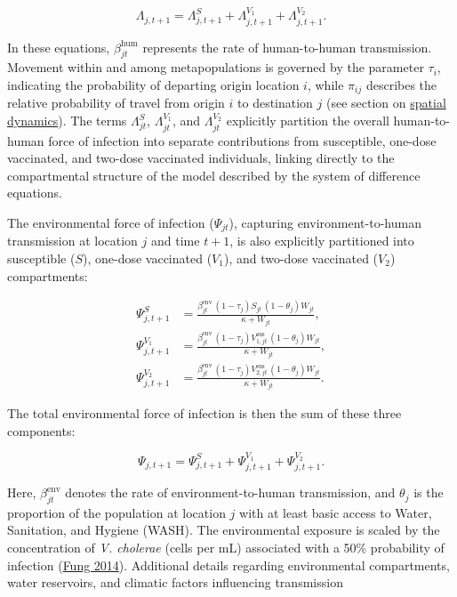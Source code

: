 \documentclass[
]{book}
\begin{document}
\begin{equation}
\Lambda_{j,t+1} =  \Lambda^S_{j,t+1} + \Lambda^{V_1}_{j,t+1} + \Lambda^{V_2}_{j,t+1}.
\label{eq:foi-human-total}
\end{equation}

In these equations, \(\beta_{jt}^{\text{hum}}\) represents the rate of human-to-human transmission. Movement within and among metapopulations is governed by the parameter \(\tau_i\), indicating the probability of departing origin location \(i\), while \(\pi_{ij}\) describes the relative probability of travel from origin \(i\) to destination \(j\) (see section on \hyperref[spatial-dynamics]{spatial dynamics}). The terms \(\Lambda^{S}_{jt}\), \(\Lambda^{V_1}_{jt}\), and \(\Lambda^{V_2}_{jt}\) explicitly partition the overall human-to-human force of infection into separate contributions from susceptible, one-dose vaccinated, and two-dose vaccinated individuals, linking directly to the compartmental structure of the model described by the system of difference equations.

The environmental force of infection (\(\Psi_{jt}\)), capturing environment-to-human transmission at location \(j\) and time \(t+1\), is also explicitly partitioned into susceptible (\(S\)), one-dose vaccinated (\(V_1\)), and two-dose vaccinated (\(V_2\)) compartments:

\begin{equation}
\begin{aligned}
\Psi^S_{j,t+1} &= \frac{\beta_{jt}^{\text{env}}\, (1-\tau_{j})S_{jt}\,(1-\theta_j)W_{jt}}{\kappa + W_{jt}},\\[4mm]
\Psi^{V_1}_{j,t+1} &= \frac{\beta_{jt}^{\text{env}}\, (1-\tau_{j})V^{\text{sus}}_{1,jt}\,(1-\theta_j)W_{jt}}{\kappa + W_{jt}},\\[4mm]
\Psi^{V_2}_{j,t+1} &= \frac{\beta_{jt}^{\text{env}}\, (1-\tau_{j})V^{\text{sus}}_{2,jt}\,(1-\theta_j)W_{jt}}{\kappa + W_{jt}}.
\end{aligned}
\label{eq:foi-environment}
\end{equation}

The total environmental force of infection is then the sum of these three components:

\begin{equation}
\Psi_{j,t+1} = \Psi^S_{j,t+1} + \Psi^{V_1}_{j,t+1} + \Psi^{V_2}_{j,t+1}.
\label{eq:foi-environment-total}
\end{equation}

Here, \(\beta_{jt}^{\text{env}}\) denotes the rate of environment-to-human transmission, and \(\theta_j\) is the proportion of the population at location \(j\) with at least basic access to Water, Sanitation, and Hygiene (WASH). The environmental exposure is scaled by the concentration of \emph{V. cholerae} (cells per mL) associated with a 50\% probability of infection (\href{https://www.ncbi.nlm.nih.gov/pmc/articles/PMC3926264/}{Fung 2014}). Additional details regarding environmental compartments, water reservoirs, and climatic factors influencing transmission
\end{document}
